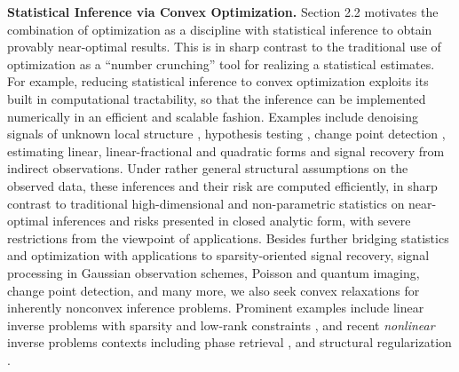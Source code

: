 \documentclass[12pt]{article}
\begin{document}
\noindent
{\bf Statistical Inference via Convex Optimization. }
%
 Section 2.2 motivates the combination of optimization as a discipline with statistical inference to obtain provably near-optimal results. This is in sharp contrast to the traditional use of optimization as a ``number crunching'' tool for realizing a statistical estimates.  For example, reducing statistical inference to convex optimization exploits its built in computational tractability, so that the inference can be implemented numerically in an efficient and scalable fashion.
Examples include denoising signals of unknown local structure \cite{JN2009A,JN2010,HJNO2015,OHJN2016}, hypothesis testing \cite{Burnashev1982,GJN2015,sequential,JuNemAffineDetectors}, change point detection \cite{Burnashev1979,JN2015,ChangePoint}, estimating linear, linear-fractional and quadratic forms \cite{Don94,JN2009,linquadforms} and signal recovery \cite{CT1A,CT1,DonC1,DonC2,l2estimation} from indirect observations.
Under rather general structural assumptions on the observed data, these inferences and their risk  are computed efficiently,  in sharp contrast to traditional high-dimensional and non-parametric statistics on near-optimal inferences and risks presented in closed analytic form, with severe restrictions from the viewpoint of applications. Besides  further bridging statistics and optimization with applications to sparsity-oriented signal recovery, signal processing in Gaussian observation schemes, Poisson and quantum imaging, change point detection, and many more, we also seek convex relaxations for inherently nonconvex inference problems.  Prominent examples include linear inverse problems with sparsity \cite{DonC1,candes06st,candes08in} and low-rank constraints \cite{ReFaPa07-1,CaTao09-1,davenport16ov}, and recent  {\em nonlinear} inverse problems contexts including  phase retrieval  \cite{bahmani16ph}, and structural regularization  \cite{bahmani17an}.
\end{document}
